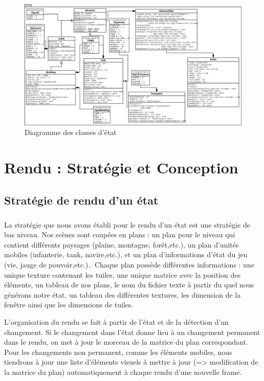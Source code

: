 \documentclass[12pt]{report}
\begin{document}
\newpage
\thispagestyle{empty}
\begin{landscape}
\begin{figure}[h]
    \includegraphics[scale=0.43]{Status.png}
    \caption{Diagramme des classes d'état}
\end{figure}
\end{landscape}
    
\newpage

\chapter{Rendu : Stratégie et Conception}
    \section{Stratégie de rendu d'un état}
    \paragraph{}La stratégie que nous avons établi pour le rendu d'un état est une stratégie de bas niveau. Nos scènes sont coupées en plans : un plan pour le niveau qui contient différents paysages (plaine, montagne, forêt,etc.), un plan d'unités mobiles (infanterie, tank, navire,etc.), et un plan d'informations d'état du jeu (vie, jauge de pouvoir,etc.).. Chaque plan possède différentes informations : une unique texture contenant les tuiles, une unique matrice avec la position des éléments, un tableau de nos plans, le nom du fichier texte à partir du quel nous générons notre état, un tableau des différentes textures, les dimension de la fenêtre ainsi que les dimensions de tuiles. 
    
    \paragraphe{}L'organisation du rendu se fait à partir de l'état et de la détection d'un changement. Si le changement dans l’état donne lieu à un changement permanent dans le rendu, on met à jour le morceau de la matrice du plan correspondant. Pour les changements non permanent, comme les éléments mobiles, nous tiendrons à jour une liste d’éléments visuels à mettre à jour (=> modiﬁcation de la matrice du plan) automatiquement à chaque rendu d’une nouvelle frame.  
    
\end{document}
